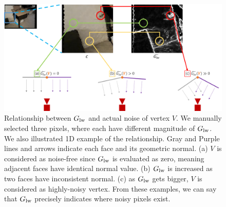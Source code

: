 \begin{figure}
    \centering
    \includegraphics[width=\textwidth]{figures/3_method_relationship_gradient_lightweight_and_noise_full_tone_changed.png}
    \caption{Relationship between $G\textsubscript{lw}$ and actual noise of vertex $V$. We manually selected three pixels, where each have different magnitude of $G\textsubscript{lw}$. We also illustrated 1D example of the relationship. Gray and Purple lines and arrows indicate each face and its geometric normal. (a) $V$ is considered as noise-free since $G\textsubscript{lw}$ is evaluated as zero, meaning adjacent faces have identical normal value. (b) $G\textsubscript{lw}$ is increased as two faces have inconsistent normal. (c) as $G\textsubscript{lw}$ gets bigger, $V$ is considered as highly-noisy vertex. From these examples, we can say that $G\textsubscript{lw}$ precisely indicates where noisy pixels exist.}
    \label{fig:three}
\end{figure}


